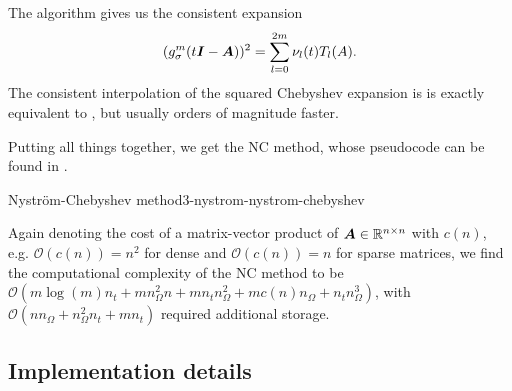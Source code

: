 The algorithm gives us the consistent expansion
\begin{equation}
    (g_{\sigma}^m(t\boldsymbol{I} - \boldsymbol{A}))^2 = \sum_{l=0}^{2m} \nu_l(t) T_l(A).
    \label{equ:3-nystrom-consistent-chebyshev-expansion}
\end{equation}
The consistent interpolation of the squared Chebyshev expansion is
is exactly equivalent to \cite[algorithm~5]{lin2017randomized}, but
usually orders of magnitude faster.\\


Putting all things together, we get the \gls{NC} method, whose pseudocode
can be found in .
\begin{algo}{Nystr\"om-Chebyshev method}{3-nystrom-nystrom-chebyshev}
    
\end{algo}

Again denoting the cost of a matrix-vector product of $\boldsymbol{A} \in \mathbb{R}^{n \times n}$
with $c(n)$, e.g. $\mathcal{O}(c(n)) = n^2$ for dense and $\mathcal{O}(c(n)) = n$
for sparse matrices, we find the computational complexity of the \gls{NC}
method to be $\mathcal{O}(m \log(m) n_t + m n_{\Omega}^2 n + m n_t n_{\Omega}^2 +  m c(n) n_{\Omega} + n_t n_{\Omega}^3)$, with
$\mathcal{O}(n n_{\Omega} + n_{\Omega}^2 n_t + m n_t)$ required additional storage.


\subsection{Implementation details}
\label{subsec:3-nystrom-implementation-details}

